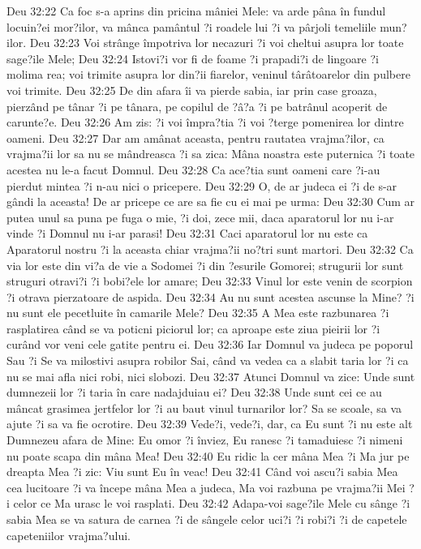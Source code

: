 Deu 32:22  Ca foc s-a aprins din pricina mâniei Mele: va arde pâna în fundul locuin?ei mor?ilor, va mânca pamântul ?i roadele lui ?i va pârjoli temeliile mun?ilor.
Deu 32:23  Voi strânge împotriva lor necazuri ?i voi cheltui asupra lor toate sage?ile Mele;
Deu 32:24  Istovi?i vor fi de foame ?i prapadi?i de lingoare ?i molima rea; voi trimite asupra lor din?ii fiarelor, veninul târâtoarelor din pulbere voi trimite.
Deu 32:25  De din afara îi va pierde sabia, iar prin case groaza, pierzând pe tânar ?i pe tânara, pe copilul de ?â?a ?i pe batrânul acoperit de carunte?e.
Deu 32:26  Am zis: ?i voi împra?tia ?i voi ?terge pomenirea lor dintre oameni.
Deu 32:27  Dar am amânat aceasta, pentru rautatea vrajma?ilor, ca vrajma?ii lor sa nu se mândreasca ?i sa zica: Mâna noastra este puternica ?i toate acestea nu le-a facut Domnul.
Deu 32:28  Ca ace?tia sunt oameni care ?i-au pierdut mintea ?i n-au nici o pricepere.
Deu 32:29  O, de ar judeca ei ?i de s-ar gândi la aceasta! De ar pricepe ce are sa fie cu ei mai pe urma:
Deu 32:30  Cum ar putea unul sa puna pe fuga o mie, ?i doi, zece mii, daca aparatorul lor nu i-ar vinde ?i Domnul nu i-ar parasi!
Deu 32:31  Caci aparatorul lor nu este ca Aparatorul nostru ?i la aceasta chiar vrajma?ii no?tri sunt martori.
Deu 32:32  Ca via lor este din vi?a de vie a Sodomei ?i din ?esurile Gomorei; strugurii lor sunt struguri otravi?i ?i bobi?ele lor amare;
Deu 32:33  Vinul lor este venin de scorpion ?i otrava pierzatoare de aspida.
Deu 32:34  Au nu sunt acestea ascunse la Mine? ?i nu sunt ele pecetluite în camarile Mele?
Deu 32:35  A Mea este razbunarea ?i rasplatirea când se va poticni piciorul lor; ca aproape este ziua pieirii lor ?i curând vor veni cele gatite pentru ei.
Deu 32:36  Iar Domnul va judeca pe poporul Sau ?i Se va milostivi asupra robilor Sai, când va vedea ca a slabit taria lor ?i ca nu se mai afla nici robi, nici slobozi.
Deu 32:37  Atunci Domnul va zice: Unde sunt dumnezeii lor ?i taria în care nadajduiau ei?
Deu 32:38  Unde sunt cei ce au mâncat grasimea jertfelor lor ?i au baut vinul turnarilor lor? Sa se scoale, sa va ajute ?i sa va fie ocrotire.
Deu 32:39  Vede?i, vede?i, dar, ca Eu sunt ?i nu este alt Dumnezeu afara de Mine: Eu omor ?i înviez, Eu ranesc ?i tamaduiesc ?i nimeni nu poate scapa din mâna Mea!
Deu 32:40  Eu ridic la cer mâna Mea ?i Ma jur pe dreapta Mea ?i zic: Viu sunt Eu în veac!
Deu 32:41  Când voi ascu?i sabia Mea cea lucitoare ?i va începe mâna Mea a judeca, Ma voi razbuna pe vrajma?ii Mei ?i celor ce Ma urasc le voi rasplati.
Deu 32:42  Adapa-voi sage?ile Mele cu sânge ?i sabia Mea se va satura de carnea ?i de sângele celor uci?i ?i robi?i ?i de capetele capeteniilor vrajma?ului.
